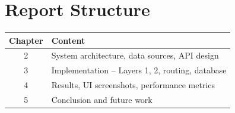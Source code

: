 \section{Report Structure}

\begin{table}[H]
\centering
\begin{tabular}{cl}
\toprule
\textbf{Chapter} & \textbf{Content} \\
\midrule
2 & System architecture, data sources, API design \\
3 & Implementation -- Layers 1, 2, routing, database \\
4 & Results, UI screenshots, performance metrics \\
5 & Conclusion and future work \\
\bottomrule
\end{tabular}
\end{table}

